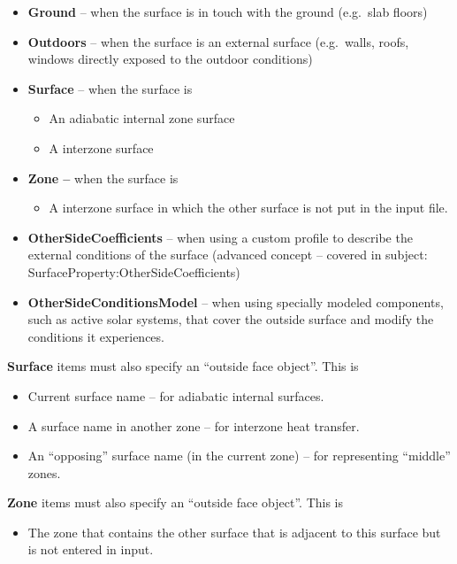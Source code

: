 \begin{itemize}
\item
  \textbf{Ground} -- when the surface is in touch with the ground (e.g.~slab floors)
\item
  \textbf{Outdoors} -- when the surface is an external surface (e.g.~walls, roofs, windows directly exposed to the outdoor conditions)
\item
  \textbf{Surface} -- when the surface is
  \begin{itemize}
    \item
      An adiabatic internal zone surface
    \item
      A interzone surface
  \end{itemize}
\item
  \textbf{Zone --} when the surface is
  \begin{itemize}
    \item
      A interzone surface in which the other surface is not put in the input file.
  \end{itemize}
\item
  \textbf{OtherSideCoefficients} -- when using a custom profile to describe the external conditions of the surface (advanced concept -- covered in subject: SurfaceProperty:OtherSideCoefficients)
\item
  \textbf{OtherSideConditionsModel} -- when using specially modeled components, such as active solar systems, that cover the outside surface and modify the conditions it experiences.
\end{itemize}

\textbf{Surface} items must also specify an ``outside face object''. This is

\begin{itemize}
\tightlist
\item
  Current surface name -- for adiabatic internal surfaces.
\item
  A surface name in another zone -- for interzone heat transfer.
\item
  An ``opposing'' surface name (in the current zone) -- for representing ``middle'' zones.
\end{itemize}

\textbf{Zone} items must also specify an ``outside face object''. This is

\begin{itemize}
\tightlist
\item
  The zone that contains the other surface that is adjacent to this surface but is not entered in input.
\end{itemize}

